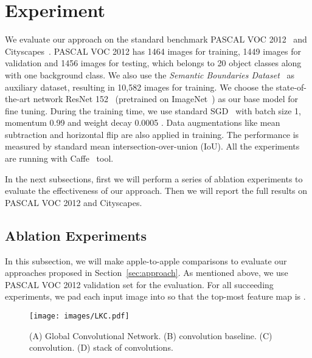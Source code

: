 \documentclass[10pt,twocolumn,letterpaper]{article}
\begin{document}
\section{Experiment}
	We evaluate our approach on the standard benchmark PASCAL VOC 2012~\cite{everingham2010pascal,everingham2015pascal} and Cityscapes~\cite{cordts2016cityscapes}. PASCAL VOC 2012 has 1464 images for training, 1449 images for validation and 1456 images for testing, which belongs to 20 object classes along with one background class. We also use the \emph{Semantic Boundaries Dataset}~\cite{hariharan2011semantic} as auxiliary dataset, resulting in 10,582 images for training. We choose the state-of-the-art network ResNet 152~\cite{He_2016_CVPR} (pretrained on ImageNet~\cite{ILSVRC15}) as our base model for fine tuning. During the training time, we use standard SGD~\cite{krizhevsky2012imagenet} with batch size 1, momentum 0.99 and weight decay 0.0005 . Data augmentations like mean subtraction and horizontal flip are also applied in training. The performance is measured by standard mean intersection-over-union (IoU). All the experiments are running with Caffe~\cite{jia2014caffe} tool.
	


\par
	In the next subsections, first we will perform a series of ablation experiments to evaluate the effectiveness of our approach. Then we will report the full results on PASCAL VOC 2012 and Cityscapes.
\subsection{Ablation Experiments}
   \label{subsec:mod-comp}
	In this subsection, we will make apple-to-apple comparisons to evaluate our approaches proposed in Section~\ref{sec:approach}. As mentioned above, we use PASCAL VOC 2012 validation set for the evaluation. For all succeeding experiments, we pad each input image into  so that the top-most feature map is . 
   \begin{figure}[h]
      \begin{center}
         \texttt{[image: images/LKC.pdf]}
      \end{center}
      \caption{(A) Global Convolutional Network. (B)  convolution baseline. (C)  convolution. (D) stack of  convolutions. }
      \label{fig:lkc}
   \end{figure}
\end{document}
